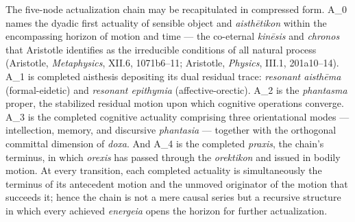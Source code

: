 \documentclass{article}
\begin{document}
The five-node actualization chain may be recapitulated in compressed form. A\_0 names the dyadic first actuality of sensible object and \textit{aisth\={e}tikon} within the encompassing horizon of motion and time --- the co-eternal \textit{kin\={e}sis} and \textit{chronos} that Aristotle identifies as the irreducible conditions of all natural process (Aristotle, \textit{Metaphysics}, XII.6, 1071b6--11; Aristotle, \textit{Physics}, III.1, 201a10--14). A\_1 is completed aisthesis depositing its dual residual trace: \textit{resonant aisth\={e}ma} (formal-eidetic) and \textit{resonant epithymia} (affective-orectic). A\_2 is the \textit{phantasma} proper, the stabilized residual motion upon which cognitive operations converge. A\_3 is the completed cognitive actuality comprising three orientational modes --- intellection, memory, and discursive \textit{phantasia} --- together with the orthogonal committal dimension of \textit{doxa}. And A\_4 is the completed \textit{praxis}, the chain's terminus, in which \textit{orexis} has passed through the \textit{orektikon} and issued in bodily motion. At every transition, each completed actuality is simultaneously the terminus of its antecedent motion and the unmoved originator of the motion that succeeds it; hence the chain is not a mere causal series but a recursive structure in which every achieved \textit{energeia} opens the horizon for further actualization.
\end{document}
